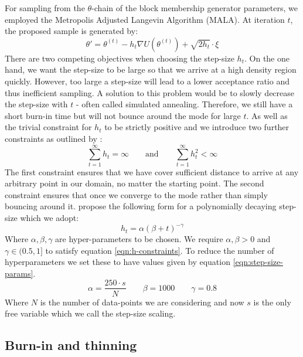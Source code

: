 For sampling from the $\theta$-chain of the block membership generator parameters, we employed the Metropolis Adjusted Langevin Algorithm (MALA). At iteration $t$, the proposed sample is generated by:
%
\begin{equation}
	\theta' = \theta^{(t)} - h_t \nabla U(\theta^{(t)}) + \sqrt{2h_t} \cdot \xi
\end{equation}
%
There are two competing objectives when choosing the step-size $h_t$. On the one hand, we want the step-size to be large so that we arrive at a high density region quickly. However, too large a step-size will lead to a lower acceptance ratio and thus inefficient sampling. A solution to this problem would be to slowly decrease the step-size with $t$ - often called simulated annealing. Therefore, we still have a short burn-in time but will not bounce around the mode for large $t$. As well as the trivial constraint for $h_t$ to be strictly positive and we introduce two further constraints as outlined by \citet{Bayesian-SGLD}:
%
\begin{equation}
	\sum_{t=1}^{\infty} h_t = \infty \qquad \textrm{and} \qquad
	\sum_{t=1}^{\infty} h_t^2 < \infty
	\label{eqn:h-constraints}
\end{equation}
%
The first constraint ensures that we have cover sufficient distance to arrive at any arbitrary point in our domain, no matter the starting point. The second constraint ensures that once we converge to the mode rather than simply bouncing around it. \citet{Bayesian-SGLD} propose the following form for a polynomially decaying step-size which we adopt:
%
\begin{equation}
	h_t = \alpha(\beta + t)^{-\gamma}
\end{equation}
%
Where $\alpha, \beta, \gamma$ are hyper-parameters to be chosen. We require $\alpha,\beta > 0$ and $\gamma \in (0.5, 1]$ to satisfy equation \ref{eqn:h-constraints}. To reduce the number of hyperparameters we set these to have values given by equation \ref{eqn:step-size-params}.
%
\begin{equation}
	\alpha = \frac{250 \cdot s}{N} \qquad \beta = 1000 \qquad \gamma = 0.8
	\label{eqn:step-size-params}
\end{equation}
%
Where $N$ is the number of data-points we are considering and now $s$ is the only free variable which we call the step-size scaling.

\subsection{Burn-in and thinning}
\label{appdx:burn-in-thinning}


